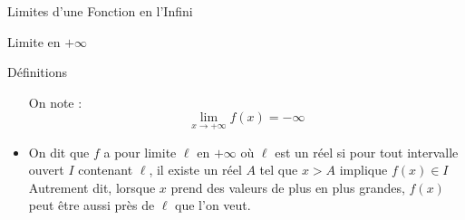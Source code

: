 \documentclass{coursbook}
\begin{document}
\begin{Gpartie}{Limites d'une Fonction en l'Infini}
\begin{Spartie}{Limite en $+\infty$}
\begin{SSpartie}{Définitions}
\begin{itemize}
                    On note : \[\boxed{\lim\limits_{x\to +\infty}f(x)=-\infty}\]
                    \begin{center}
                        \parbox{\linewidth}{}
                    \end{center}
                    \vspace*{2ex}
                    \item   On dit que $f$ a pour limite $\ell$ en $+\infty$ où $\ell$ est un réel si pour tout intervalle ouvert $I$ contenant $\ell$, il existe un réel $A$ tel que $x>A$ implique $f(x)\in I$ \\ Autrement dit, lorsque $x$ prend des valeurs de plus en plus grandes, $f(x)$ peut être aussi près de $\ell$ que l'on veut.
                    

\end{itemize}
\end{SSpartie}
\end{Spartie}
\end{Gpartie}
\end{document}
